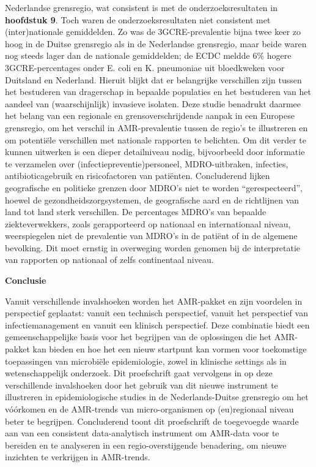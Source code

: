 \documentclass[
]{book}
\begin{document}
Nederlandse grensregio, wat consistent is met de onderzoeksresultaten in \textbf{hoofdstuk 9}. Toch waren de onderzoeksresultaten niet consistent met (inter)nationale gemiddelden. Zo was de 3GCRE-prevalentie bijna twee keer zo hoog in de Duitse grensregio als in de Nederlandse grensregio, maar beide waren nog steeds lager dan de nationale gemiddelden; de ECDC meldde 6\% hogere 3GCRE-percentages onder E. coli en K. pneumoniae uit bloedkweken voor Duitsland en Nederland. Hieruit blijkt dat er belangrijke verschillen zijn tussen het bestuderen van dragerschap in bepaalde populaties en het bestuderen van het aandeel van (waarschijnlijk) invasieve isolaten. Deze studie benadrukt daarmee het belang van een regionale en grensoverschrijdende aanpak in een Europese grensregio, om het verschil in AMR-prevalentie tussen de regio's te illustreren en om potentiële verschillen met nationale rapporten te belichten. Om dit verder te kunnen uitwerken is een dieper detailniveau nodig, bijvoorbeeld door informatie te verzamelen over (infectiepreventie)personeel, MDRO-uitbraken, infecties, antibioticagebruik en risicofactoren van patiënten. Concluderend lijken geografische en politieke grenzen door MDRO's niet te worden ``gerespecteerd'', hoewel de gezondheidszorgsystemen, de geografische aard en de richtlijnen van land tot land sterk verschillen. De percentages MDRO's van bepaalde ziekteverwekkers, zoals gerapporteerd op nationaal en internationaal niveau, weerspiegelen niet de prevalentie van MDRO's in de patiënt of in de algemene bevolking. Dit moet ernstig in overweging worden genomen bij de interpretatie van rapporten op nationaal of zelfs continentaal niveau.

\textbf{Conclusie}

Vanuit verschillende invalshoeken worden het AMR-pakket en zijn voordelen in perspectief geplaatst: vanuit een technisch perspectief, vanuit het perspectief van infectiemanagement en vanuit een klinisch perspectief. Deze combinatie biedt een gemeenschappelijke basis voor het begrijpen van de oplossingen die het AMR-pakket kan bieden en hoe het een nieuw startpunt kan vormen voor toekomstige toepassingen van microbiële epidemiologie, zowel in klinische settings als in wetenschappelijk onderzoek. Dit proefschrift gaat vervolgens in op deze verschillende invalshoeken door het gebruik van dit nieuwe instrument te illustreren in epidemiologische studies in de Nederlands-Duitse grensregio om het vóórkomen en de AMR-trends van micro-organismen op (eu)regionaal niveau beter te begrijpen. Concluderend toont dit proefschrift de toegevoegde waarde aan van een consistent data-analytisch instrument om AMR-data voor te bereiden en te analyseren in een regio-overstijgende benadering, om nieuwe inzichten te verkrijgen in AMR-trends.
\end{document}
